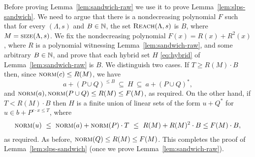 \begin{appendixproof}
Before proving Lemma~\ref{lem:sandwich-raw} we use it to prove Lemma~\ref{lem:slps-sandwich}.
We need to argue that there is a nondecreasing polynomial $F$ such that 
for every \dslps $(\Lambda, s)$ and $B\in\mathbb{N}$, the set $\textsc{Reach}(\Lambda,s)$ is
 {$B$}, where $M=\textsc{size}(\Lambda,s)$.
%
We fix the nondecreasing polynomial $F(x) = R(x) + R^2(x)$, where $R$ is a polynomial witnessing 
Lemma~\ref{lem:sandwich-raw}, and some arbitrary $B \in \mathbb{N}$,
and prove that each hybrid set $H$ \eqref{eq:hybrid} 
of Lemma~\ref{lem:sandwich-raw} is
 {$B$}.
% 
%
We distinguish two cases.
If $T \geq R(M) \cdot B$ then, since $\textsc{norm}(c)\leq R(M)$, we have
\[
a + (P \cup Q)^{\leq B} \ \subseteq \ H \ \subseteq \ a + (P \cup Q)^*,
\]
and $\textsc{norm}(a), \textsc{norm}(P \cup Q) \leq R(M) \leq F(M)$, as required. 
%
On the other hand, if  $T < R(M) \cdot B$ then $H$ is a finite union
of linear sets of the form $u + Q^*$ for $u \in b + P^{c \cdot x \leq T}$, where
\begin{align*}
\textsc{norm}(u) \ \leq \ \textsc{norm}(a) + \textsc{norm}(P) \cdot T 
\ \leq \ R(M) + R(M)^2 \cdot B \leq  F(M) \cdot B,
\end{align*}
as required. 
As before,  $\textsc{norm}(Q) \leq R(M) \leq F(M)$.
This completes the proof of Lemma~\ref{lem:slps-sandwich} (once
we prove Lemma~\ref{lem:sandwich-raw}). 
\end{appendixproof}
